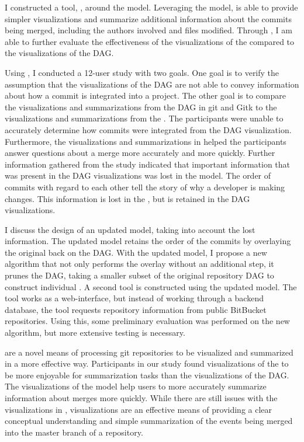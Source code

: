 I constructed a tool, \tool{}, around the \mt{} model. Leveraging the
model, \tool{} is able to provide simpler visualizations and summarize
additional information about the commits being merged, including the
authors involved and files modified. Through \tool{}, I am able to
further evaluate the effectiveness of the visualizations of the \mt{}
compared to the visualizations of the DAG\@.

Using \tool{}, I conducted a 12-user study with two goals. One goal is
to verify the assumption that the visualizations of the DAG are not able
to convey information about how a commit is integrated into a project.
The other goal is to compare the visualizations and summarizations from
the DAG in git and Gitk to the visualizations and summarizations from
the \mt{}. The participants were unable to accurately determine how
commits were integrated from the DAG visualization. Furthermore, the
visualizations and summarizations in \tool{} helped the participants
answer questions about a merge more accurately and more quickly. Further
information gathered from the study indicated that important information
that was present in the DAG visualizations was lost in the \mt{} model.
The order of commits with regard to each other tell the story of why a
developer is making changes. This information is lost in the \mt{}, but
is retained in the DAG visualizations.

I discuss the design of an updated model, taking into account the lost
information. The updated model retains the order of the commits by
overlaying the original \mt{} back on the DAG\@. With the updated model, I
propose a new algorithm that not only performs the overlay without an
additional step, it prunes the DAG, taking a smaller subset of the
original repository DAG to construct individual . A second tool is
constructed using the updated model. The tool works as a web-interface,
but instead of working through a backend database, the tool requests
repository information from public BitBucket repositories. Using this,
some preliminary evaluation was performed on the new algorithm, but more
extensive testing is necessary.

 are a novel means of processing git repositories to be visualized
and summarized in a more effective way. Participants in our study found
visualizations of the \mt{} to be more enjoyable for summarization tasks
than the visualizations of the DAG. The visualizations of the \mt{}
model help users to more accurately summarize information about merges
more quickly. While there are still issues with the visualizations in
\tool{}, \mt{} visualizations are an effective means of providing a
clear conceptual understanding and simple summarization of the events
being merged into the master branch of a repository.
